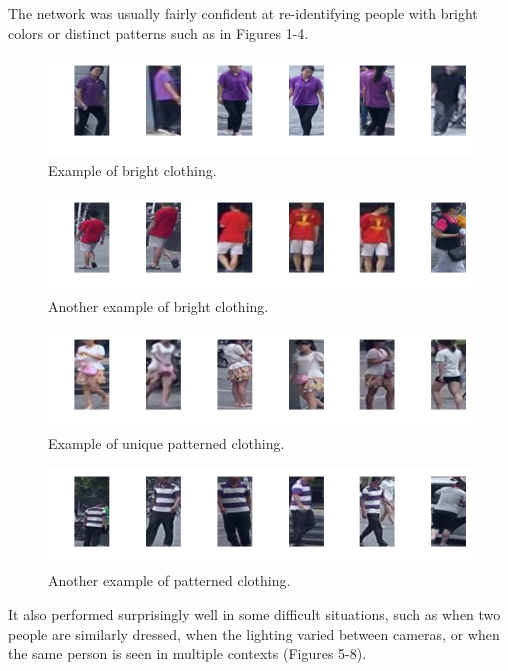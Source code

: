 The network was usually fairly confident at re-identifying people with bright colors or distinct patterns such as in Figures 1-4.
\begin{figure}[H]
\label{fig:bright1}
        \centering \includegraphics[width=0.8\columnwidth]{figures/person_reid/example7_confident.png}
        \caption{Example of bright clothing.}
\end{figure}

\begin{figure}[H]
\label{fig:bright2}
    \centering \includegraphics[width=0.8\columnwidth]{figures/person_reid/example8_confident.png}
    \caption{Another example of bright clothing.}
\end{figure}

\begin{figure}[H]
\label{fig:pattern1}
    \centering \includegraphics[width=0.8\columnwidth]{figures/person_reid/example4_perfect.png}
    \caption{Example of unique patterned clothing.}
\end{figure}

\begin{figure}[H]
\label{fig:pattern2}
    \centering \includegraphics[width=0.8\columnwidth]{figures/person_reid/example12_pattern.png}
    \caption{Another example of patterned clothing.}
\end{figure}

It also performed surprisingly well in some difficult situations, such as when two people are similarly dressed, when the lighting varied between cameras, or when the same person is seen in multiple contexts (Figures 5-8).

